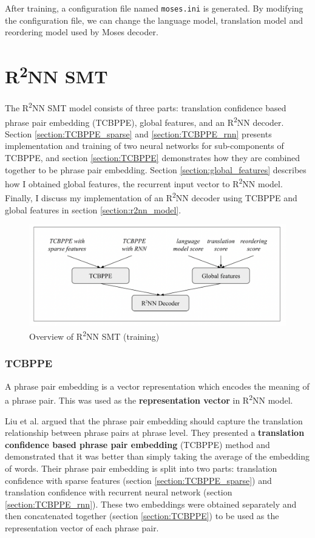 \documentclass[12pt,a4paper,twoside,openright]{report}
\begin{document}
After training, a configuration file named \texttt{moses.ini} is generated. By modifying the configuration file, we can change the language model, translation model and reordering model used by Moses decoder.


\section{\texorpdfstring{R\textsuperscript{2}NN}{R2NN} SMT}\label{section:r2nn}

The R\textsuperscript{2}NN SMT model consists of three parts: translation confidence based phrase pair embedding (TCBPPE), global features, and an R\textsuperscript{2}NN decoder. Section \ref{section:TCBPPE_sparse} and \ref{section:TCBPPE_rnn} presents implementation and training of two neural networks for sub-components of TCBPPE, and section \ref{section:TCBPPE} demonstrates how they are combined together to be phrase pair embedding. Section \ref{section:global_features} describes how I obtained global features, the recurrent input vector to R\textsuperscript{2}NN model. Finally, I discuss my implementation of an R\textsuperscript{2}NN decoder using TCBPPE and global features in section \ref{section:r2nn_model}.

\begin{figure}[ht]
\centering
\includegraphics[width=1\textwidth]{images/r2nn_pipeline.png}
\caption{Overview of R\textsuperscript{2}NN SMT (training)}
\label{fig:r2nn_pipeline}
\end{figure}

\subsubsection{TCBPPE}
A phrase pair embedding is a vector representation which encodes the meaning of a phrase pair. This was used as the \textbf{representation vector} in R\textsuperscript{2}NN model. 

Liu et al.\cite{r2nn} argued that the phrase pair embedding should capture the translation relationship between phrase pairs at phrase level. They presented a \textbf{translation confidence based phrase pair embedding} (TCBPPE) method and demonstrated that it was better than simply taking the average of the embedding of words. Their phrase pair embedding is split into two parts: translation confidence with sparse features (section \ref{section:TCBPPE_sparse}) and translation confidence with recurrent neural network (section \ref{section:TCBPPE_rnn}). These two embeddings were obtained separately and then concatenated together (section \ref{section:TCBPPE}) to be used as the representation vector of each phrase pair.
\end{document}
